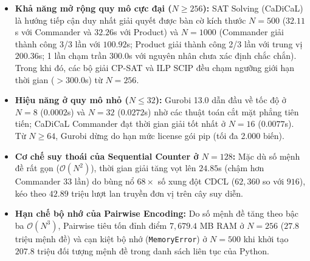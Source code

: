 \documentclass[a4paper,fleqn]{cas-sc}
\begin{document}
\begin{tcolorbox}[
    colback=boxbg, colframe=boxborder, arc=2mm, boxrule=0.85pt,
    left=12pt, right=12pt, top=8pt, bottom=8pt,
    title=\textbf{\color{primaryblue}Tóm tắt các Phát hiện Thực nghiệm Cốt lõi (Key Experimental Takeaways)},
    coltitle=primaryblue
]
\begin{itemize}[leftmargin=1.5em, itemsep=0.25em, topsep=0.2em]
    \item \textbf{Khả năng mở rộng quy mô cực đại ($N \ge 256$):} SAT Solving (CaDiCaL) là hướng tiếp cận duy nhất giải quyết được bàn cờ kích thước $N=500$ ($32.11$s với Commander và $32.26$s với Product) và $N=1000$ (Commander giải thành công 3/3 lần với $100.92$s; Product giải thành công 2/3 lần với trung vị $200.36$s; 1 lần chạm trần 300.0s với nguyên nhân chưa xác định chắc chắn). Trong khi đó, các bộ giải CP-SAT và ILP SCIP đều chạm ngưỡng giới hạn thời gian ($>300.0$s) từ $N=256$.
    \item \textbf{Hiệu năng ở quy mô nhỏ ($N \le 32$):} Gurobi 13.0 dẫn đầu về tốc độ ở $N=8$ ($0.0002$s) và $N=32$ ($0.0272$s) nhờ các thuật toán cắt mặt phẳng tiên tiến; CaDiCaL Commander đạt thời gian giải tốt nhất ở $N=16$ ($0.0077$s). Từ $N \ge 64$, Gurobi dừng do hạn mức license gói pip (tối đa 2.000 biến).
    \item \textbf{Cơ chế suy thoái của Sequential Counter ở $N=128$:} Mặc dù số mệnh đề rất gọn ($\mathcal{O}(N^2)$), thời gian giải tăng vọt lên $24.85$s (chậm hơn Commander 33 lần) do bùng nổ $68\times$ số xung đột CDCL ($62{,}360$ so với $916$), kéo theo $42.89$ triệu lượt lan truyền đơn vị trên cây suy diễn.
    \item \textbf{Hạn chế bộ nhớ của Pairwise Encoding:} Do số mệnh đề tăng theo bậc ba $\mathcal{O}(N^3)$, Pairwise tiêu tốn đỉnh điểm $7{,}679.4$ MB RAM ở $N=256$ ($27.8$ triệu mệnh đề) và cạn kiệt bộ nhớ (\texttt{MemoryError}) ở $N=500$ khi khởi tạo $207.8$ triệu đối tượng mệnh đề trong danh sách liên tục của Python.
\end{itemize}
\end{tcolorbox}
\end{document}
